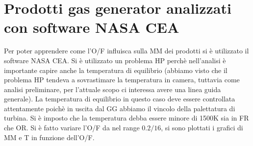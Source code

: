 \section{Prodotti gas generator analizzati con software NASA CEA}
\label{appendix:prodotti gas generator}

Per poter apprendere come l'O/F influisca sulla MM dei prodotti si è utilizzato il software NASA CEA. Si è utilizzato un problema HP perchè nell'analisi è importante capire anche la temperatura di equilibrio (abbiamo visto che il problema HP tendeva a sovrastimare la temperatura in camera, tuttavia come analisi preliminare, per l'attuale scopo ci interessa avere una linea guida generale). La temperatura di equilibrio in questo caso deve essere controllata attentamente poichè in uscita dal GG abbiamo il vincolo della palettatura di turbina. Si è imposto che la temperatura debba essere minore di 1500K sia in FR che OR. Si è fatto variare l'O/F da nel range $0.2 / 16$, si sono plottati i grafici di MM e T in funzione dell'O/F.